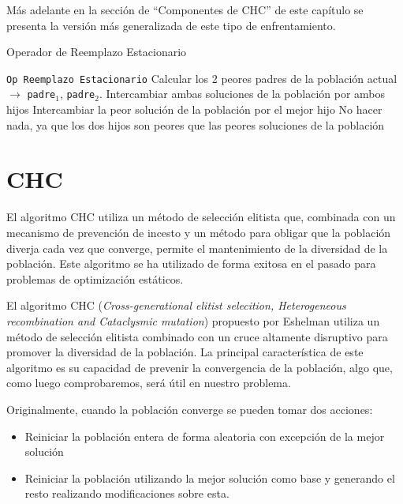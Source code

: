 Más adelante en la sección de ``Componentes de CHC'' de este capítulo se presenta la versión más generalizada de este tipo de enfrentamiento.

\begin{algorithm}[h]
\caption{Operador de Reemplazo Estacionario}\label{alg:ORE}
\begin{algorithmic}[1]
\Procedure \texttt{Op Reemplazo Estacionario}
\State Calcular los 2 peores padres de la población actual $\xrightarrow{}{}$ \texttt{padre$_1$}, \texttt{padre$_2$}.
	\State Intercambiar ambas soluciones de la población por ambos hijos
	\State Intercambiar la peor solución de la población por el mejor hijo
\Else
	\State No hacer nada, ya que los dos hijos son peores que las peores soluciones de la población
\EndIf
\EndProcedure
\end{algorithmic}
\end{algorithm}

\section{CHC}

El algoritmo CHC utiliza un método de selección elitista que, combinada con un mecanismo de prevención de incesto y un método para obligar que la población diverja cada vez que converge, permite el mantenimiento de la diversidad de la población. 
Este algoritmo se ha utilizado de forma exitosa en el pasado para problemas de optimización estáticos. 

El algoritmo CHC (\textit{Cross-generational elitist selecition, Heterogeneous recombination and Cataclysmic mutation}) propuesto por Eshelman utiliza un método de selección elitista  combinado con un cruce altamente disruptivo para promover la diversidad de la población. 
La principal característica de este algoritmo es su capacidad de prevenir la convergencia de la población, algo que, como luego comprobaremos, será útil en nuestro problema. 


Originalmente, cuando la población converge se pueden tomar dos acciones:
\begin{itemize}
	\item Reiniciar la población entera de forma aleatoria con excepción de la mejor solución
	\item Reiniciar la población utilizando la mejor solución como base y generando el resto realizando modificaciones sobre esta.
\end{itemize}

